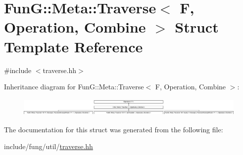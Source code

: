\hypertarget{structFunG_1_1Meta_1_1Traverse}{\section{Fun\-G\-:\-:Meta\-:\-:Traverse$<$ F, Operation, Combine $>$ Struct Template Reference}
\label{structFunG_1_1Meta_1_1Traverse}
}


{\ttfamily \#include $<$traverse.\-hh$>$}

Inheritance diagram for Fun\-G\-:\-:Meta\-:\-:Traverse$<$ F, Operation, Combine $>$\-:\begin{figure}[H]
\begin{center}
\leavevmode
\includegraphics[height=0.921053cm]{structFunG_1_1Meta_1_1Traverse}
\end{center}
\end{figure}


The documentation for this struct was generated from the following file\-:\begin{DoxyCompactItemize}
\item 
include/fung/util/\hyperlink{traverse_8hh}{traverse.\-hh}\end{DoxyCompactItemize}
